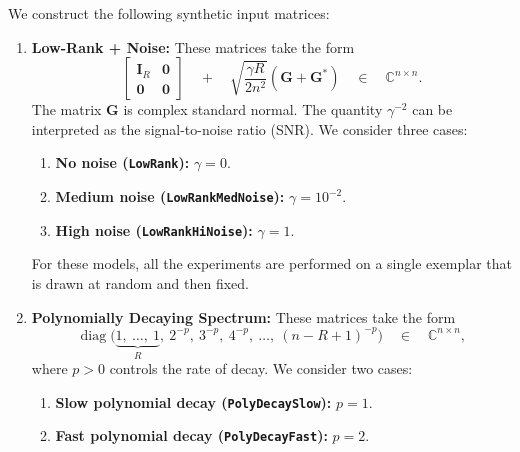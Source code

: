 \documentclass[final]{siamart1116}
\numberwithin{equation}{section}
\numberwithin{theorem}{section}
\numberwithin{figure}{section}
\newcommand{\C}{\mathbb{C}}
\newcommand{\mtx}[1]{\bm{#1}}
\newcommand{\Id}{\mathbf{I}}
\newcommand{\diag}{\operatorname{diag}}
\begin{document}
We construct the following synthetic input matrices:

\vspace{0.5pc}


\begin{enumerate}
\item	\textbf{Low-Rank + Noise:}  These matrices take the form
$$
\begin{bmatrix} \Id_R & \mtx{0} \\ \mtx{0} & \mtx{0} \end{bmatrix}
	\quad+\quad \sqrt{\frac{\gamma R}{2n^2}} (\mtx{G} + \mtx{G}^*)
	\quad\in\quad \C^{n \times n}.
$$
The matrix $\mtx{G}$ is complex standard normal.  The quantity $\gamma^{-2}$
can be interpreted as the signal-to-noise ratio (SNR).  We consider three cases:

\vspace{0.5pc}

\begin{enumerate}
\item	\textbf{No noise (\texttt{LowRank}):}  $\gamma = 0$.

\item	\textbf{Medium noise (\texttt{LowRankMedNoise}):}  $\gamma = 10^{-2}$.

\item	\textbf{High noise (\texttt{LowRankHiNoise}):}  $\gamma = 1$.
\end{enumerate}

\vspace{0.5pc}

\noindent
For these models, all the experiments are performed on a single exemplar
that is drawn at random and then fixed.

\vspace{0.5pc}


\item	\textbf{Polynomially Decaying Spectrum:}  These matrices take the form
$$
\diag\big( \underbrace{1,\ \dots,\ 1}_R,\ 2^{-p},\ 3^{-p},\ 4^{-p},\ \dots,\ (n-R+1)^{-p} \big) \quad\in\quad \C^{n \times n},
$$
where $p > 0$ controls the rate of decay.  We consider two cases:

\vspace{0.5pc}

\begin{enumerate}
\item	\textbf{Slow polynomial decay (\texttt{PolyDecaySlow}):} $p = 1$.
\item	\textbf{Fast polynomial decay (\texttt{PolyDecayFast}):} $p = 2$.
\end{enumerate}


\end{enumerate}
\end{document}

